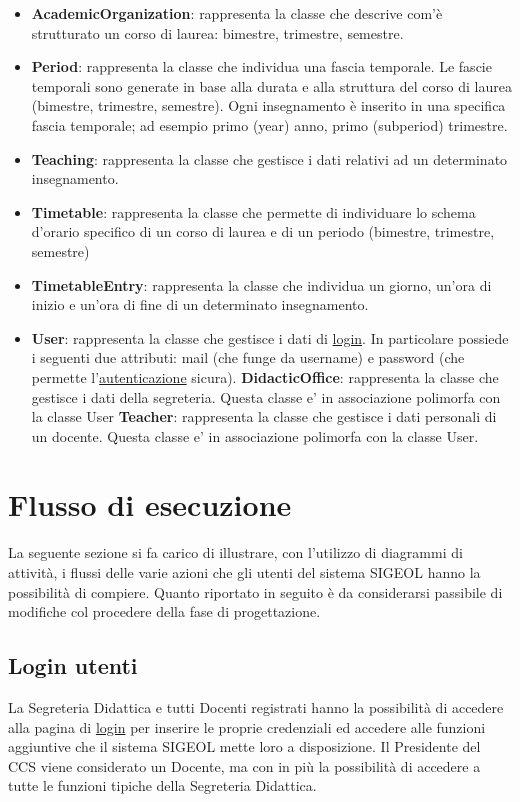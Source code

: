 \documentclass[11pt,a4paper]{article}
\begin{document}
\begin{itemize}
\item \textbf{AcademicOrganization}: rappresenta la classe che descrive com'è strutturato un corso di laurea: bimestre, trimestre, semestre.

\item \textbf{Period}: rappresenta la classe che individua una fascia temporale.
Le fascie temporali sono generate in base alla durata e alla struttura del corso di laurea (bimestre, trimestre, semestre). Ogni insegnamento è inserito in una specifica fascia temporale; ad esempio primo (year) anno, primo (subperiod) trimestre.

\item \textbf{Teaching}: rappresenta la classe che gestisce i dati relativi ad un determinato insegnamento.

\item \textbf{Timetable}: rappresenta la classe che permette di individuare lo schema d'orario specifico di un corso di laurea e di un periodo (bimestre, trimestre, semestre) 

\item \textbf{TimetableEntry}: rappresenta la classe che individua un giorno, un'ora di inizio e un'ora di fine di un determinato insegnamento.

\item \textbf{User}: rappresenta la classe che gestisce i dati di \underline{login}. In particolare possiede i seguenti due attributi: mail (che funge da username) e password (che permette l'\underline{autenticazione} sicura).
\subitem \textbf{DidacticOffice}: rappresenta la classe che gestisce i dati della segreteria. 
Questa classe e' in associazione polimorfa con la classe User 
\subitem \textbf{Teacher}: rappresenta la classe che gestisce i dati personali di un docente.
Questa classe e' in associazione polimorfa con la classe User. 
\end{itemize}
\section{Flusso di esecuzione}
La seguente sezione si fa carico di illustrare, con l'utilizzo di diagrammi di attività, i flussi delle varie azioni che gli utenti del sistema SIGEOL hanno la possibilità di compiere.
Quanto riportato in seguito è da considerarsi passibile di modifiche col procedere della fase di progettazione.
\newpage
\subsection{Login utenti}
La Segreteria Didattica e tutti Docenti registrati hanno la possibilità di accedere alla pagina di \underline{login} per inserire le proprie credenziali ed accedere alle funzioni aggiuntive che il sistema SIGEOL mette loro a disposizione. Il Presidente del CCS viene considerato un Docente, ma con in più la possibilità di accedere a tutte le funzioni tipiche della Segreteria Didattica.
\end{document}

